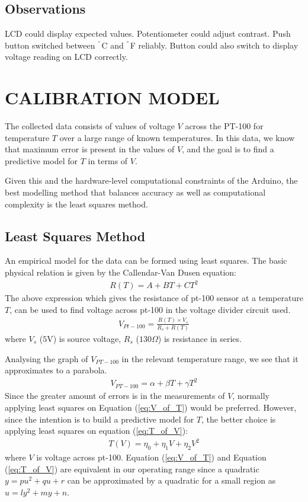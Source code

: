 \documentclass{article}
\begin{document}
\subsection{Observations}
LCD could display expected values. Potentiometer could adjust contrast. Push button switched between $^{\degree}$C and $^{\degree}$F reliably. Button could also switch to display voltage reading on LCD correctly.

\newpage
\section{CALIBRATION MODEL}
The collected data consists of values of voltage $V$ across the PT-100 for temperature $T$ over a large range of known temperatures. In this data, we know that maximum error is present in the values of $V$, and the goal is to find a predictive model for $T$ in terms of $V$.

Given this and the hardware-level computational constraints of the Arduino, the best modelling method that balances accuracy as well as computational complexity is the least squares method.

\subsection{Least Squares Method}
An empirical model for the data can be formed using least squares. The basic physical relation is given by the Callendar-Van Dusen equation:
\begin{align}
    R(T) = A + BT + CT^2
\end{align}  
The above expression which gives the resistance of pt-100 sensor at a temperature $T$, can be used to find voltage across pt-100 in the voltage divider circuit used.
\begin{align}
    V_{Pt-100} = \frac{R(T) \times V_s}{R_s + R(T)} 
\end{align}  
where $V_s$ ($5$V) is source voltage, $R_s$ ($130\Omega$) is resistance in series.

Analysing the graph of $V_{PT-100}$ in the relevant temperature range, we see that it approximates to a parabola.
\begin{align}
    V_{PT-100} = \alpha + \beta T + \gamma T^2
    \label{eq:V_of_T}
\end{align}
Since the greater amount of errors is in the measurements of $V$, normally applying least squares on Equation (\ref{eq:V_of_T}) would be preferred.
However, since the intention is to build a predictive model for $T$, the better choice is applying least squares on equation (\ref{eq:T_of_V}):
\begin{align}
    T(V) = \eta_0 + \eta_1 V + \eta_2 V^2
    \label{eq:T_of_V}
\end{align}
where $V$ is voltage across pt-100.
Equation (\ref{eq:V_of_T}) and Equation (\ref{eq:T_of_V}) are equivalent in our operating range since a quadratic $y = pu^2 + qu + r$ can be approximated by a quadratic for a small region as $u = ly^2 + my + n$.
\end{document}
